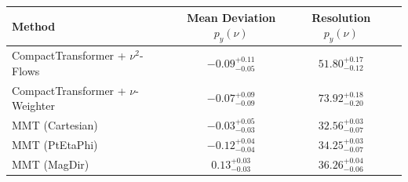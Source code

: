     \begin{tabular}{lccc}
        \toprule
        Method & Mean Deviation $p_{y}(\nu)$ & Resolution $p_{y}(\nu)$ \\
        \midrule
        CompactTransformer + $\nu^2$-Flows & $-0.09^{+0.11}_{-0.05}$ & $51.80^{+0.17}_{-0.12}$ \\
        CompactTransformer + $\nu$-Weighter & $-0.07^{+0.09}_{-0.09}$ & $73.92^{+0.18}_{-0.20}$ \\
        MMT (Cartesian) & $-0.03^{+0.05}_{-0.03}$ & $32.56^{+0.03}_{-0.07}$ \\
        MMT (PtEtaPhi) & $-0.12^{+0.04}_{-0.04}$ & $34.25^{+0.03}_{-0.07}$ \\
        MMT (MagDir) & $0.13^{+0.03}_{-0.03}$ & $36.26^{+0.04}_{-0.06}$ \\
        \bottomrule
    \end{tabular}